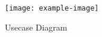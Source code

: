 \blindtext
\begin{figure}[h]
	\caption{Usecase Diagram}
	\centering
	\texttt{[image: example-image]}
	\label{fig:dia:usecase}
\end{figure}
